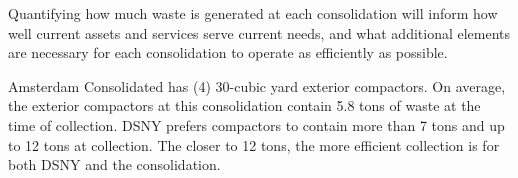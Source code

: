 
    Quantifying how much waste is generated at each consolidation will inform how well current assets and services serve current needs, and what additional elements are necessary for each consolidation to operate as efficiently as possible.
    
    Amsterdam Consolidated has (4) 30-cubic yard exterior compactors. On average, the exterior compactors at this consolidation contain 5.8 tons of waste at the time of collection. DSNY prefers compactors to contain more than 7 tons and up to 12 tons at collection. The closer to 12 tons, the more efficient collection is for both DSNY and the consolidation.